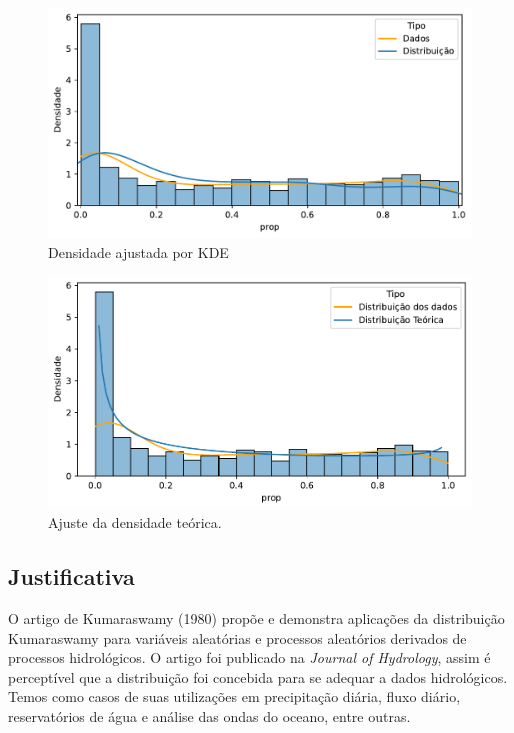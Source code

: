 \documentclass[
]{article}
\begin{document}
\begin{figure}

{\centering \includegraphics{report_files/figure-pdf/fig-kde-output-1.pdf}

}

\caption{\label{fig-kde}Densidade ajustada por KDE}

\end{figure}

\begin{figure}

{\centering \includegraphics{report_files/figure-pdf/fig-theoric-density-output-1.pdf}

}

\caption{\label{fig-theoric-density}Ajuste da densidade teórica.}

\end{figure}

\subsection{Justificativa}

O artigo de Kumaraswamy (1980) propõe e demonstra aplicações da
distribuição Kumaraswamy para variáveis aleatórias e processos
aleatórios derivados de processos hidrológicos. O artigo foi publicado
na \emph{Journal of Hydrology}, assim é perceptível que a distribuição
foi concebida para se adequar a dados hidrológicos. Temos como casos de
suas utilizações em precipitação diária, fluxo diário, reservatórios de
água e análise das ondas do oceano, entre outras.
\end{document}
